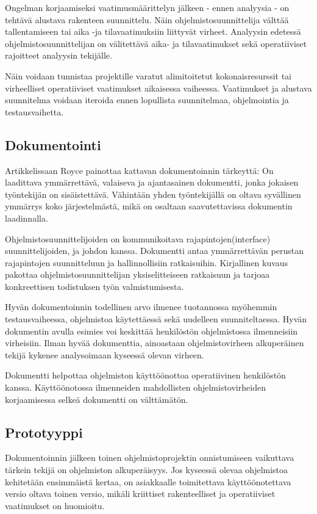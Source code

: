 \documentclass[finnish]{tktltiki2}
\theoremstyle{definition}
\theoremstyle{remark}
\begin{document}
Ongelman korjaamiseksi vaatimusmäärittelyn jälkeen - ennen analyysia - on tehtävä alustava rakenteen suunnittelu. Näin ohjelmistosuunnittelija välttää tallentamiseen tai aika -ja tilavaatimuksiin liittyvät virheet. Analyysin edetessä ohjelmistosuunnittelijan on välitettävä aika- ja tilavaatimukset sekä operatiiviset rajoitteet analyysin tekijälle\cite{ROY70}.

Näin voidaan tunnistaa projektille varatut alimitoitetut kokonaisresurssit tai virheelliset operatiiviset vaatimukset aikaisessa vaiheessa. Vaatimukset ja alustava suunnitelma voidaan iteroida ennen lopullista suunnitelmaa, ohjelmointia ja testausvaihetta\cite{ROY70}.

\subsection*{Dokumentointi}

Artikkelissaan Royce painottaa kattavan dokumentoinnin tärkeyttä: On laadittava ymmärrettävä, valaiseva ja ajantasainen dokumentti, jonka jokaisen työntekijän on sisäistettävä. Vähintään yhden työntekijällä on oltava syvällinen ymmärrys koko järjestelmästä, mikä on osaltaan saavutettavissa dokumentin laadinnalla\cite{ROY70}.

Ohjelmistosuunnittelijoiden on kommunikoitava rajapintojen(interface) suunnittelijoiden, ja johdon kanssa. Dokumentti antaa ymmärrettävän perustan rajapintojen suunnitteluun ja hallinnollisiin ratkaisuihin. Kirjallinen kuvaus pakottaa ohjelmistosuunnittelijan yksiselitteiseen ratkaisuun ja tarjoaa konkreettisen todistuksen työn valmistumisesta\cite{ROY70}.

Hyvän dokumentoinnin todellinen arvo ilmenee tuotannossa myöhemmin testausvaiheessa, ohjelmistoa käytettäessä sekä uudelleen suunniteltaessa. Hyvän dokumentin avulla esimies voi keskittää henkilöstön ohjelmistossa ilmenneisiin virheisiin. Ilman hyvää dokumenttia, ainoastaan ohjelmistovirheen alkuperäinen tekijä kykenee analysoimaan kyseessä olevan virheen\cite{ROY70}.

Dokumentti helpottaa ohjelmiston käyttöönottoa operatiivinen henkilöstön kanssa. Käyttöönotossa ilmenneiden mahdollisten ohjelmistovirheiden korjaamisessa selkeä dokumentti on välttämätön\cite{ROY70}.

\subsection*{Prototyyppi}

Dokumentoinnin jälkeen toinen ohjelmistoprojektin onnistumiseen vaikuttava tärkein tekijä on ohjelmiston alkuperäisyys. Jos kyseessä olevaa ohjelmistoa kehitetään ensimmäistä kertaa, on asiakkaalle toimitettava käyttöönotettava versio oltava toinen versio, mikäli kriittiset rakenteelliset ja operatiiviset vaatimukset on huomioitu\cite{ROY70}.
\end{document}
